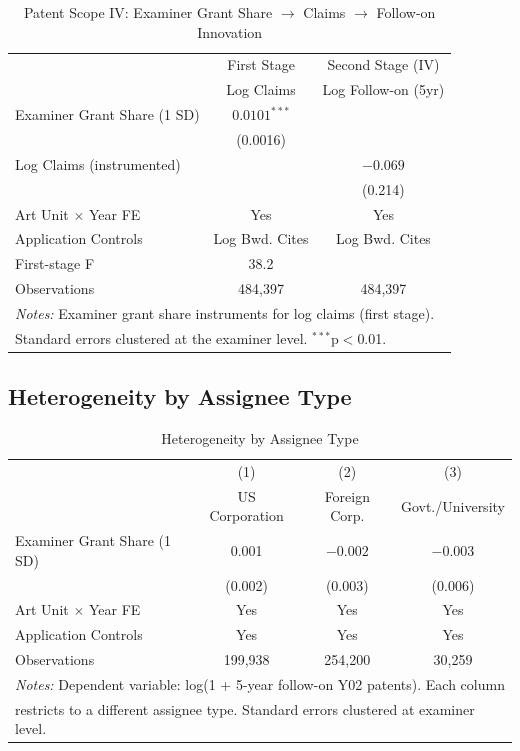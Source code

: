\documentclass[12pt]{article}
\begin{document}
\begin{table}[htbp]
\centering
\caption{Patent Scope IV: Examiner Grant Share $\rightarrow$ Claims $\rightarrow$ Follow-on Innovation}
\label{tab:iv}
\begin{tabular}{lcc}
\hline\hline
 & First Stage & Second Stage (IV) \\
 & Log Claims & Log Follow-on (5yr) \\
\hline
Examiner Grant Share (1 SD) & $0.0101^{***}$ &  \\
 & (0.0016) & \\
Log Claims (instrumented) &  & $-0.069$ \\
 & & (0.214) \\
\hline
Art Unit $\times$ Year FE & Yes & Yes \\
Application Controls & Log Bwd. Cites & Log Bwd. Cites \\
First-stage F & 38.2 &  \\
Observations & 484,397 & 484,397 \\
\hline\hline
\multicolumn{3}{l}{\footnotesize\emph{Notes:} Examiner grant share instruments for log claims (first stage).} \\
\multicolumn{3}{l}{\footnotesize Standard errors clustered at the examiner level. $^{***}$p$<$0.01.} \\
\end{tabular}
\end{table}


\subsection{Heterogeneity by Assignee Type}
\label{app:assignee}

\begin{table}[htbp]
\centering
\caption{Heterogeneity by Assignee Type}
\label{tab:assignee}
\begin{tabular}{lccc}
\hline\hline
 & (1) & (2) & (3) \\
 & US Corporation & Foreign Corp. & Govt./University \\
\hline
Examiner Grant Share (1 SD) & 0.001 & $-0.002$ & $-0.003$ \\
 & (0.002) & (0.003) & (0.006) \\
\hline
Art Unit $\times$ Year FE & Yes & Yes & Yes \\
Application Controls & Yes & Yes & Yes \\
Observations & 199,938 & 254,200 & 30,259 \\
\hline\hline
\multicolumn{4}{l}{\footnotesize\emph{Notes:} Dependent variable: log(1 + 5-year follow-on Y02 patents). Each column} \\
\multicolumn{4}{l}{\footnotesize restricts to a different assignee type. Standard errors clustered at examiner level.} \\
\end{tabular}
\end{table}
\end{document}
